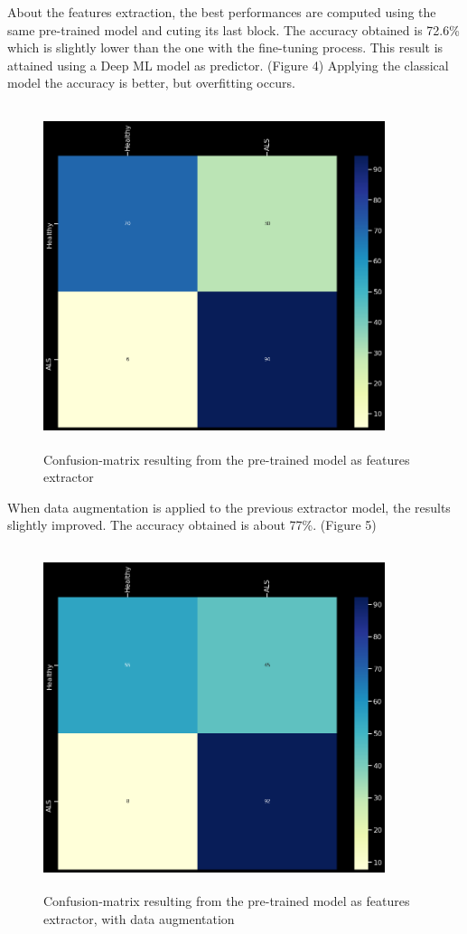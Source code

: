 About the features extraction, the best performances are computed using the same pre-trained model and cuting its last block. The accuracy obtained is 72.6\% which is slightly lower than the one with the fine-tuning process. This result is attained using a Deep ML model as predictor. (Figure 4) Applying the classical model the accuracy is better, but overfitting occurs. 
\begin{figure}[H]
\centering
\caption{Confusion-matrix resulting from the pre-trained model as features extractor}
\includegraphics[width=10cm, height=10cm]{extractor_model_results}
\end{figure}

When data augmentation is applied to the previous extractor model, the results slightly improved. The accuracy obtained is about 77\%. (Figure 5)
\begin{figure}[H]
\centering
\caption{Confusion-matrix resulting from the pre-trained model as features extractor, with data augmentation}
\includegraphics[width=10cm, height=10cm]{extractor_data_augmentation_model_results}
\end{figure}


